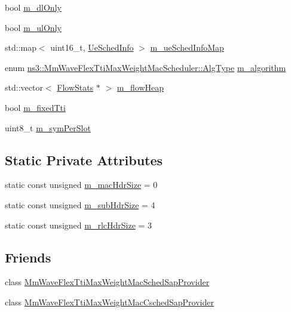 \begin{DoxyCompactItemize}
\item 
bool \hyperlink{classns3_1_1MmWaveFlexTtiMaxWeightMacScheduler_a1109bf69ff2902c2bb80904ae7b61aae}{m\+\_\+dl\+Only}
\item 
bool \hyperlink{classns3_1_1MmWaveFlexTtiMaxWeightMacScheduler_ad789c10291d375b6d022aed236b8134e}{m\+\_\+ul\+Only}
\item 
std\+::map$<$ uint16\+\_\+t, \hyperlink{structns3_1_1MmWaveFlexTtiMaxWeightMacScheduler_1_1UeSchedInfo}{Ue\+Sched\+Info} $>$ \hyperlink{classns3_1_1MmWaveFlexTtiMaxWeightMacScheduler_a6c90cb4d10b9d6347f7447508f5bebfe}{m\+\_\+ue\+Sched\+Info\+Map}
\item 
enum \hyperlink{classns3_1_1MmWaveFlexTtiMaxWeightMacScheduler_a1c15c536cd0b5b7c19533c208c7817a0}{ns3\+::\+Mm\+Wave\+Flex\+Tti\+Max\+Weight\+Mac\+Scheduler\+::\+Alg\+Type} \hyperlink{classns3_1_1MmWaveFlexTtiMaxWeightMacScheduler_a334a408b37c8c7cb50203d357021ea21}{m\+\_\+algorithm}
\item 
std\+::vector$<$ \hyperlink{structns3_1_1MmWaveFlexTtiMaxWeightMacScheduler_1_1FlowStats}{Flow\+Stats} $\ast$ $>$ \hyperlink{classns3_1_1MmWaveFlexTtiMaxWeightMacScheduler_a5914fa5ecbe0fef6968a27a04df53e7b}{m\+\_\+flow\+Heap}
\item 
bool \hyperlink{classns3_1_1MmWaveFlexTtiMaxWeightMacScheduler_a5642744f4685af9143c44bd8ed23077b}{m\+\_\+fixed\+Tti}
\item 
uint8\+\_\+t \hyperlink{classns3_1_1MmWaveFlexTtiMaxWeightMacScheduler_a1f72c01284b245a37f959230bf15e46b}{m\+\_\+sym\+Per\+Slot}
\end{DoxyCompactItemize}
\subsection*{Static Private Attributes}
\begin{DoxyCompactItemize}
\item 
static const unsigned \hyperlink{classns3_1_1MmWaveFlexTtiMaxWeightMacScheduler_a8d671bd294d55bf2525a81e926b99386}{m\+\_\+mac\+Hdr\+Size} = 0
\item 
static const unsigned \hyperlink{classns3_1_1MmWaveFlexTtiMaxWeightMacScheduler_a0f66f1575529b6532871202961e92c86}{m\+\_\+sub\+Hdr\+Size} = 4
\item 
static const unsigned \hyperlink{classns3_1_1MmWaveFlexTtiMaxWeightMacScheduler_a12646efe5a10dfd27c8839b224b2ed53}{m\+\_\+rlc\+Hdr\+Size} = 3
\end{DoxyCompactItemize}
\subsection*{Friends}
\begin{DoxyCompactItemize}
\item 
class \hyperlink{classns3_1_1MmWaveFlexTtiMaxWeightMacScheduler_a61b688a098f2816e728a6f4be606ab79}{Mm\+Wave\+Flex\+Tti\+Max\+Weight\+Mac\+Sched\+Sap\+Provider}
\item 
class \hyperlink{classns3_1_1MmWaveFlexTtiMaxWeightMacScheduler_a0926a668459ef2930ea42b79e8216e1d}{Mm\+Wave\+Flex\+Tti\+Max\+Weight\+Mac\+Csched\+Sap\+Provider}
\end{DoxyCompactItemize}
